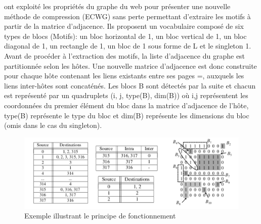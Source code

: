 
	\citep{asano2008efficient} ont exploité les propriétés du graphe du web pour présenter une nouvelle méthode de compression (ECWG) sans perte permettant d'extraire les motifs à partir de la matrice d'adjacence. Ils proposent un vocabulaire composé de six types de blocs (Motifs): un bloc horizontal de 1, un bloc vertical de 1, un bloc diagonal de 1, un rectangle de 1, un bloc de 1 sous forme de L et le singleton 1. Avant de procéder à l'extraction des motifs, la liste d'adjacence du graphe est partitionnée selon les hôtes. Une nouvelle matrice d'adjacence est donc construite pour chaque hôte contenant les liens existants entre ses pages =, auxquels les liens inter-hôtes sont concaténés.
					Les blocs B sont détectés par la suite et chacun est représenté par un quadruplets (i, j, type(B), dim(B)) où i,j représentent les coordonnées du premier élément du bloc dans la matrice d'adjacence de l'hôte, type(B) représente le type du bloc et dim(B) représente les dimensions du bloc (omis dans le cas du singleton). 
					\begin{figure}[h]
					\includegraphics[scale=0.5]{ressources/image/inter_intra.png} 
					\caption{Exemple illustrant le principe de fonctionnement \citep{asano2008efficient}}
					\label{interIntra}
				\end{figure}